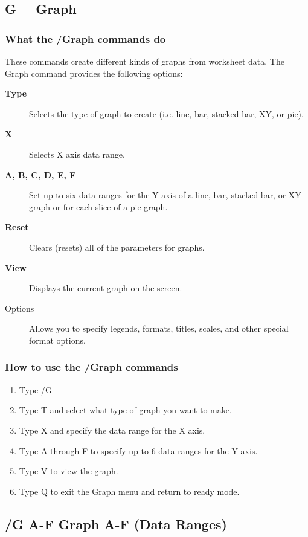 \subsection*{G  \ \     Graph}

\subsubsection*{        What the /Graph commands do}
        These commands create different kinds of graphs from worksheet data.
        The Graph command provides the following options:
\begin{description}
\item[{\bf Type}]{    Selects the type of graph to create (i.e. line, bar, stacked
                bar, XY, or pie). }
\item[{\bf X}]{      Selects X axis data range.}
\item[{\bf A, B, C, D, E, F}]{Set up to six data ranges for the Y axis
                of a line, bar, stacked bar, or XY graph or for each slice of a pie
                graph.}
\item[{\bf Reset}]{   Clears (resets) all of the parameters for graphs.}
\item[{\bf View}]{    Displays the current graph on the screen.}
\item[{Options}]{ Allows you to specify legends, formats, titles, scales, and
                other special format options.}
\end{description}

\subsubsection*{How to use the /Graph commands}
\begin{enumerate}
\item{Type /G}
\item{Type T and select what type of graph you want to make.}
\item{Type X and specify the data range for the X axis.}
\item{Type A through F to specify up to 6 data ranges for the Y axis.}
\item{Type V to view the graph.}
\item{Type Q to exit the Graph menu and return to ready mode.}
\end{enumerate}

\subsection*{/G A-F  Graph A-F (Data Ranges)}

